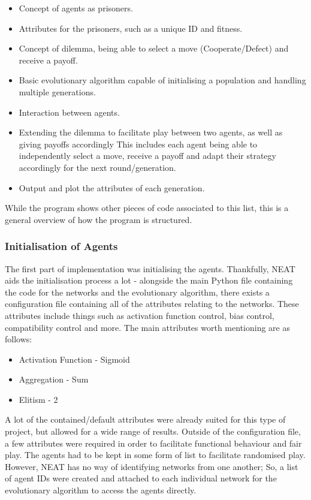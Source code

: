 \documentclass[12pt,a4paper]{article}
\begin{document}
\begin{itemize}
  \item Concept of agents as prisoners.
  \item Attributes for the prisoners, such as a unique ID and fitness.
  \item Concept of dilemma, being able to select a move (Cooperate/Defect) and receive a payoff.
  \item Basic evolutionary algorithm capable of initialising a population and handling multiple generations.
  \item Interaction between agents.
  \item Extending the dilemma to facilitate play between two agents, as well as giving payoffs accordingly This includes each agent being able to independently select a move, receive a payoff
	and adapt their strategy accordingly for the next round/generation.
  \item Output and plot the attributes of each generation. \\
\end{itemize}

While the program shows other pieces of code associated to this list, this is a general overview of how the program is structured. \\

\subsubsection{Initialisation of Agents}
The first part of implementation was initialising the agents. Thankfully, NEAT aids the initialisation process a lot - alongside the main Python file containing the code for the networks and the evolutionary algorithm, there exists a configuration file containing all of the attributes relating to the networks. These attributes include things such as activation function control, bias control, compatibility control and more. The main attributes worth mentioning are as follows: \\

\begin{itemize}
  \item Activation Function - Sigmoid
  \item Aggregation - Sum
  \item Elitism - 2 \\
\end{itemize}

A lot of the contained/default attributes were already suited for this type of project, but allowed for a wide range of results. Outside of the configuration file, a few attributes were required in order to facilitate functional behaviour and fair play. The agents had to be kept in some form of list to facilitate randomised play. However, NEAT has no way of identifying networks from one another; So, a list of agent IDs were created and attached to each individual network for the evolutionary algorithm to access the agents directly.
\end{document}
